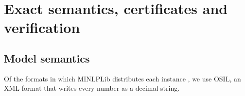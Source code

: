 \section{Exact semantics, certificates and verification}\label{sec:semantics}

\subsection{Model semantics}\label{sec:semantics-model}

Of the formats in which MINLPLib distributes each instance \citep{vigerske2026-minlplib-documentation-database-snapshot-2026}, we use OSIL, an XML format that writes every number as a decimal string.

